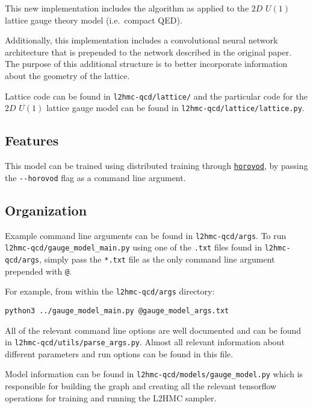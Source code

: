 This new implementation includes the algorithm as applied to the \(2D\)
\(U{(1)}\) lattice gauge theory model (i.e.~compact QED).

Additionally, this implementation includes a convolutional neural
network architecture that is prepended to the network described in the
original paper. The purpose of this additional structure is to better
incorporate information about the geometry of the lattice.

Lattice code can be found in \texttt{l2hmc-qcd/lattice/} and the
particular code for the \(2D\) \(U{(1)}\) lattice gauge model can be
found in \texttt{l2hmc-qcd/lattice/lattice.py}.

\hypertarget{features}{%
\subsection{Features}\label{features}}

This model can be trained using distributed training through
\href{https://github.com/horovod/horovod}{\texttt{horovod}}, by passing
the \texttt{-\/-horovod} flag as a command line argument.

\hypertarget{organization}{%
\subsection{Organization}\label{organization}}

Example command line arguments can be found in \texttt{l2hmc-qcd/args}.
To run \texttt{l2hmc-qcd/gauge\_model\_main.py} using one of the
\texttt{.txt} files found in \texttt{l2hmc-qcd/args}, simply pass the
\texttt{*.txt} file as the only command line argument prepended with
\texttt{@}.

For example, from within the \texttt{l2hmc-qcd/args} directory:

\begin{verbatim}
python3 ../gauge_model_main.py @gauge_model_args.txt
\end{verbatim}

All of the relevant command line options are well documented and can be
found in \texttt{l2hmc-qcd/utils/parse\_args.py}. Almost all relevant
information about different parameters and run options can be found in
this file.

Model information can be found in
\texttt{l2hmc-qcd/models/gauge\_model.py} which is responsible for
building the graph and creating all the relevant tensorflow operations
for training and running the L2HMC sampler.

